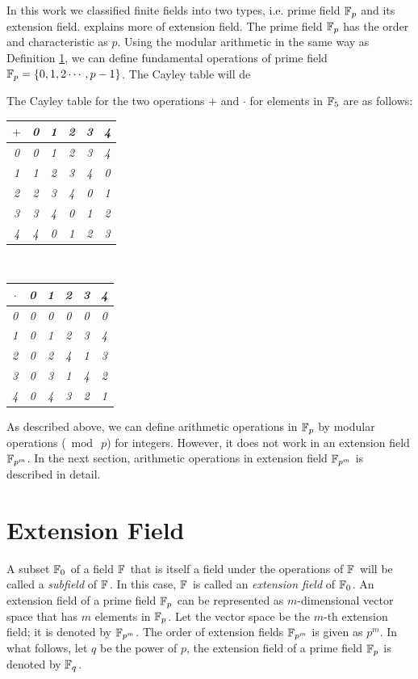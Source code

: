 In this work we classified finite fields into two types, i.e.  prime field ${\mathbb{F}}_{p}$ and its extension field. 
 explains more of extension field.
The prime field ${\mathbb{F}}_{p}$ has the order and characteristic as $p$.
Using the modular arithmetic in the same way as Definition \ref{sec:chap:fund:extenion_field}, we can define fundamental operations of prime field ${\mathbb{F}}_{p}=\{0,1,2\cdots,p-1\}$.
The Cayley table will de
\begin{example}The Cayley table for the two operations $+$ and $\cdot$ for elements in ${\mathbb{F}}_{5}$ are as follows:
	\begin{center}
		\begin{tabular}{c|ccccc}
			$+$&\em 0&\em 1&\em 2&\em 3&\em 4       \\
			\hline
			\em 0&\em 0&\em 1&\em 2&\em 3&\em 4       \\
			\em 1&\em 1&\em 2&\em 3&\em 4&\em 0      \\
			\em 2&\em 2&\em 3&\em 4&\em 0&\em 1      \\
			\em 3&\em 3&\em 4&\em 0&\em 1&\em 2      \\
			\em 4&\em 4&\em 0&\em 1&\em 2&\em 3      \\
		\end{tabular}\ \ 
		\begin{tabular}{c|ccccc}
			$\cdot$&\em 0&\em 1&\em 2&\em 3&\em 4       \\
			\hline
			\em 0&\em 0&\em 0&\em 0&\em 0&\em 0       \\
			\em 1&\em 0&\em 1&\em 2&\em 3&\em 4      \\
			\em 2&\em 0&\em 2&\em 4&\em 1&\em 3      \\
			\em 3&\em 0&\em 3&\em 1&\em 4&\em 2      \\
			\em 4&\em 0&\em 4&\em 3&\em 2&\em 1      \\
		\end{tabular}
	\end{center}
\end{example}
As described above, we can define arithmetic operations in ${\mathbb{F}}_{p}$ by modular operations ($\bmod\ p$) for integers. However, it does not work in an extension field ${\mathbb{F}}_{p^{m}}$. In the next section, arithmetic operations in extension field ${\mathbb{F}}_{p^{m}}$ is described in detail.


\section{Extension Field} 
\label{sec:chap:fund:extenion_field}
A subset ${\mathbb{F}}_{0^{}}$ of a field ${\mathbb{F}}_{^{}}$ that is itself a field under the operations of ${\mathbb{F}}_{^{}}$ will be called a {\it subfield} of ${\mathbb{F}}_{^{}}$.
In this case, ${\mathbb{F}}_{^{}}$ is called an {\it extension field} of ${\mathbb{F}}_{0^{}}$.
An extension field of a prime field ${\mathbb{F}}_{p^{}}$ can be represented as $m$-dimensional vector space that has $m$ elements in ${\mathbb{F}}_{p^{}}$.
Let the vector space be the $m$-th extension field; it is denoted by ${\mathbb{F}}_{p^{m}}$.
The order of extension fields ${\mathbb{F}}_{p^{m}}$ is given as $p^m$. 
In what follows, let $q$ be the power of $p$, the extension field of a prime field ${\mathbb{F}}_{p^{}}$ is denoted by ${\mathbb{F}}_{q^{}}$.

